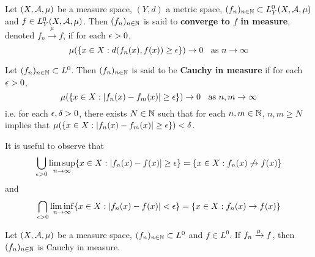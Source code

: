 \documentclass{book}
\begin{document}
	\begin{defn}  
		Let $(X, \mathcal{A}, \mu)$ be a measure space, $(Y,d)$ a metric space, $(f_n)_{n \in \mathbb{N}} \subset L_Y^0(X, \mathcal{A}, \mu)$ and $f \in L_Y^0(X, \mathcal{A}, \mu)$. Then $(f_n)_{n \in \mathbb{N}}$ is said to \textbf{converge to $f$ in measure}, denoted $f_n \xrightarrow{\mu} f$, if for each $\epsilon > 0$, $$\mu(\{x \in X: d(f_n(x), f(x)) \geq \epsilon \}) \rightarrow 0 \hspace{.2cm }\text{ as } n \rightarrow \infty$$
	\end{defn}
	
	\begin{defn}  
	Let $(f_n)_{n \in \mathbb{N}} \subset L^0$. Then $(f_n)_{n \in \mathbb{N}}$ is said to be \textbf{Cauchy in measure} if for each $\epsilon >0$, $$\mu(\{x \in X: |f_n(x) - f_m(x)| \geq \epsilon \}) \rightarrow 0 \hspace{.2cm }\text{ as } n,m \rightarrow \infty$$ 
	i.e. for each $\epsilon, \delta >0$, there exists $N \in \mathbb{N}$ such that for each $n,m \in \mathbb{N}$, $n,m \geq N$ implies that $\mu(\{x \in X: |f_n(x) - f_m(x)| \geq \epsilon \}) < \delta$.
	\end{defn}
	
	\begin{note}
		It is useful to observe that 
		$$\bigcup_{\epsilon >0}\limsup\limits_{n \rightarrow \infty} \{x \in X: |f_n(x) - f(x)| \geq \epsilon \} = \{x \in X: f_n(x) \not \rightarrow f(x) \}$$ 
		and 
		$$\bigcap_{\epsilon > 0} \liminf_{n \rightarrow \infty}\{x \in X: |f_n(x) - f(x)| < \epsilon \} = \{x \in X: f_n(x) \rightarrow f(x) \}$$ 
	\end{note}
	
	\begin{ex}  
	Let $(X, \mathcal{A}, \mu)$ be a measure space, $(f_n)_{n \in \mathbb{N}} \subset L^0$ and $f \in L^0$. If $f_n \xrightarrow{\mu} f$, then $(f_n)_{n \in \mathbb{N}}$ is Cauchy in measure.
	\end{ex}
	
\end{document}
